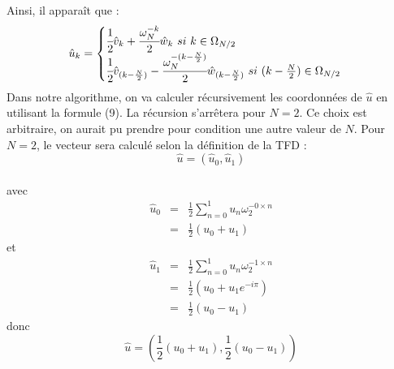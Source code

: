 \documentclass[12pt]{article}
\begin{document}
Ainsi, il apparaît que : \begin{equation}
\hat{u}_k=\begin{cases}
\cfrac{1}{2}\hat{v}_k+\cfrac{\omega_N^{-k}}{2}\hat{w}_k~si~k\in\Omega_{N/2}\\
\cfrac{1}{2}\hat{v}_{(k-\frac{N}{2})}-\cfrac{\omega_N^{-(k-\frac{N}{2})}}{2}\hat{w}_{(k-\frac{N}{2})}~si~(k-\frac{N}{2})\in\Omega_{N/2}
\end{cases}
\end{equation}
Dans notre algorithme, on va calculer récursivement les coordonnées de $\hat{u}$ en utilisant la formule (9). La récursion s'arrêtera pour $N=2$. Ce choix est arbitraire, on aurait pu prendre pour condition une autre valeur de $N$. Pour $N=2$, le vecteur sera calculé selon la définition de la TFD :\begin{equation*}
\hat{u}=(\hat{u}_0,\hat{u}_1)
\end{equation*}\\
avec \begin{eqnarray*}
\hat{u}_0&=&\frac{1}{2}\sum_{n=0}^{1}u_n\omega_2^{-0\times n}\\
&=&\frac{1}{2}(u_0+u_1)
\end{eqnarray*}
et \begin{eqnarray*}
\hat{u}_1&=&\frac{1}{2}\sum_{n=0}^{1}u_n\omega_2^{-1\times n}\\
&=&\frac{1}{2}(u_0+u_1e^{-i\pi})\\
&=&\frac{1}{2}(u_0-u_1)
\end{eqnarray*}
donc \begin{equation*}
\hat{u}=(\frac{1}{2}(u_0+u_1),\frac{1}{2}(u_0-u_1))
\end{equation*}
\end{document}
